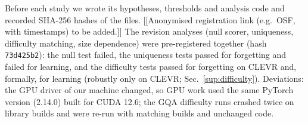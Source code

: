 Before each study we wrote its hypotheses, thresholds and analysis code and recorded SHA-256 hashes of the files.
[[Anonymised registration link (e.g.\ OSF, with timestamps) to be added.]] The revision analyses (null scorer,
uniqueness, difficulty matching, size dependence) were pre-registered together (hash \texttt{73d425b2}): the null test
failed, the uniqueness tests passed for forgetting and failed for learning, and the difficulty tests passed for
forgetting on CLEVR and, formally, for learning (robustly only on CLEVR; Sec.~\ref{sup:difficulty}). Deviations: the GPU driver of our machine changed, so GPU work used the
same PyTorch version (2.14.0) built for CUDA 12.6; the GQA difficulty runs crashed twice on library builds and were
re-run with matching builds and unchanged code.
